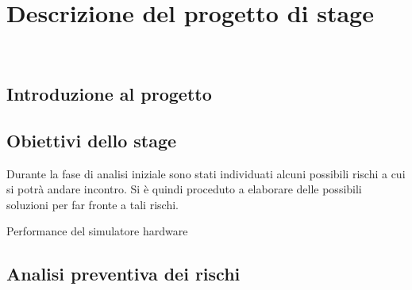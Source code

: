 \chapter{Descrizione del progetto di stage}
\label{cap:descrizione-stage}

\\

\section{Introduzione al progetto}

\section{Obiettivi dello stage}

Durante la fase di analisi iniziale sono stati individuati alcuni possibili rischi a cui si potrà andare incontro.
Si è quindi proceduto a elaborare delle possibili soluzioni per far fronte a tali rischi.\\

\begin{risk}{Performance del simulatore hardware}
    \label{risk:hardware-simulator} 
\end{risk}

\section{Analisi preventiva dei rischi}








